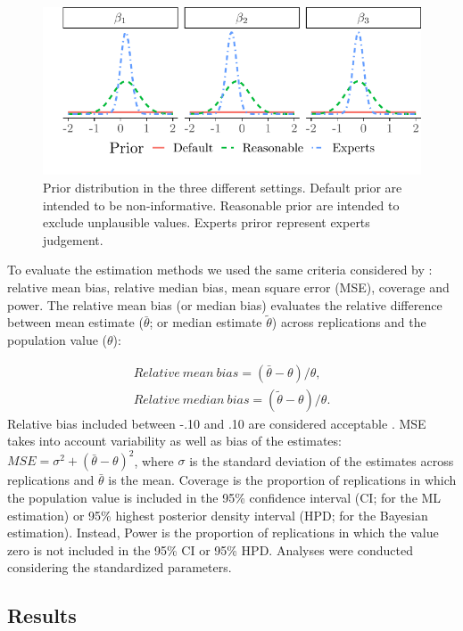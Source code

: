 \documentclass[graybox]{svmult}
\begin{document}
\begin{figure}[b]
	\sidecaption
	\includegraphics[width = .64\textwidth]{figure/Plot_prior}
	\caption{Prior distribution in the three different settings. Default prior are intended to be non-informative. Reasonable prior  are intended to exclude unplausible values. Experts priror represent experts judgement.}
	\label{fig:prior}
\end{figure}

To evaluate the estimation methods we used the same criteria considered by \cite{smidSemSmallSamples2020}: relative mean bias, relative median bias, mean square error (MSE), coverage and power. The relative mean bias (or median bias) evaluates the relative difference between mean estimate ($\bar{\theta}$; or median estimate $\widetilde{\theta}$) across replications and the population value ($\theta$):

\begin{eqnarray}
Relative\ mean\ bias = (\bar{\theta}-\theta)/\theta,\\
Relative\ median\ bias = (\widetilde{\theta}-\theta)/\theta.
\end{eqnarray}
Relative bias included between -.10 and .10 are considered acceptable \cite{smidSemSmallSamples2020}. MSE takes into account variability as well as bias of the estimates: $MSE = \sigma^2 + (\bar{\theta}- \theta)^2$, where $\sigma$ is the standard deviation of the estimates across replications and $\bar{\theta}$ is the mean. Coverage is the proportion of replications in which the population value is included in the 95\% confidence interval (CI; for the ML estimation) or 95\% highest posterior density interval (HPD; for the Bayesian estimation). Instead, Power is the proportion of replications in which the value zero is not included in the 95\% CI or 95\% HPD. Analyses were conducted considering the standardized parameters.

\subsection{Results}
\end{document}

